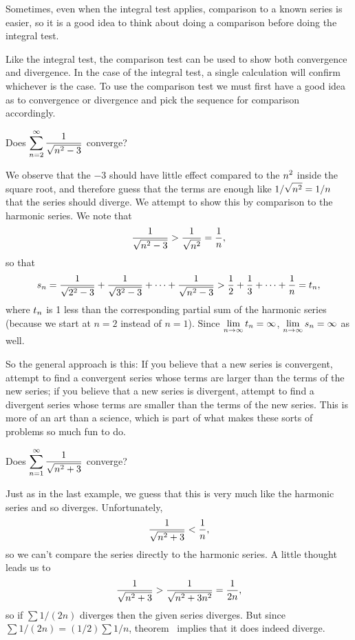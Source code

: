 Sometimes, even when the integral test applies, comparison to a known
series is easier, so it is a good idea to think about doing a
comparison before doing the integral test.

Like the integral test, the comparison test can be used to show both
convergence and divergence. In the case of the integral test, a single
calculation will confirm whichever is the case. To use the comparison
test we must first have a good idea as to convergence or divergence
and pick the sequence for comparison accordingly.

\begin{example} Does $\displaystyle\sum_{n=2}^\infty {1\over\sqrt{n^2-3}}$ converge?
\end{example}

\begin{solution}
We observe that the $-3$ should have little effect compared to the
$\displaystyle n^2$ inside the square root, and therefore guess that the terms are
enough like $\displaystyle 1/\sqrt{n^2}=1/n$ that the series should diverge. We
attempt to show this by comparison to the harmonic series. We note
that 
$${1\over\sqrt{n^2-3}} > {1\over\sqrt{n^2}} = {1\over n},$$
so that
$$
  s_n={1\over\sqrt{2^2-3}}+{1\over\sqrt{3^2-3}}+\cdots+
  {1\over\sqrt{n^2-3}} > {1\over 2} + {1\over3}+\cdots+{1\over n}=t_n,
$$
where $\displaystyle t_n$ is 1 less than the corresponding partial sum of the
harmonic series (because we start at $n=2$ instead of $n=1$). Since
$\displaystyle\lim_{n\to\infty}t_n=\infty$, $\displaystyle\lim_{n\to\infty}s_n=\infty$ as
well.
\end{solution}

So the general approach is this: If you believe that a new series is
convergent, attempt to find a convergent series whose terms are larger
than the terms of the new series; if you believe that a new series is
divergent, attempt to find a divergent series whose terms are smaller
than the terms of the new series.  This is more of an art than a
science, which is part of what makes these sorts of problems so much
fun to do.

\begin{example} Does $\displaystyle\sum_{n=1}^\infty {1\over\sqrt{n^2+3}}$ converge?
\end{example}

\begin{solution}
Just as in the last example, we guess that this is very much like the
harmonic series and so diverges. Unfortunately,
$${1\over\sqrt{n^2+3}} < {1\over n},$$
so we can't compare the series directly to the harmonic series.
A little thought leads us to
$${1\over\sqrt{n^2+3}} > {1\over\sqrt{n^2+3n^2}} = {1\over2n},$$ so if
$\sum 1/(2n)$ diverges then the given series diverges. But since $\sum
1/(2n)=(1/2)\sum 1/n$, theorem~ implies
that it does indeed diverge.
\end{solution}


